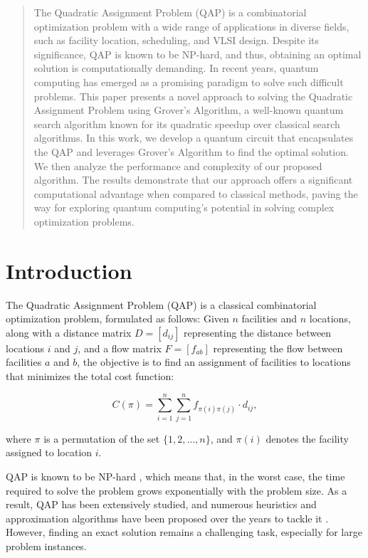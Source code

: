 \begin{abstract}

The Quadratic Assignment Problem (QAP) is a combinatorial optimization problem with a wide range of applications in diverse fields, such as facility location, scheduling, and VLSI design. Despite its significance, QAP is known to be NP-hard, and thus, obtaining an optimal solution is computationally demanding. In recent years, quantum computing has emerged as a promising paradigm to solve such difficult problems. This paper presents a novel approach to solving the Quadratic Assignment Problem using Grover's Algorithm, a well-known quantum search algorithm known for its quadratic speedup over classical search algorithms. In this work, we develop a quantum circuit that encapsulates the QAP and leverages Grover's Algorithm to find the optimal solution. We then analyze the performance and complexity of our proposed algorithm. The results demonstrate that our approach offers a significant computational advantage when compared to classical methods, paving the way for exploring quantum computing's potential in solving complex optimization problems.

\end{abstract}

\section{Introduction}

The Quadratic Assignment Problem (QAP) is a classical combinatorial optimization problem, formulated as follows: Given $n$ facilities and $n$ locations, along with a distance matrix $D = [d_{ij}]$ representing the distance between locations $i$ and $j$, and a flow matrix $F = [f_{ab}]$ representing the flow between facilities $a$ and $b$, the objective is to find an assignment of facilities to locations that minimizes the total cost function:

\begin{equation}
    C(\pi) = \sum_{i=1}^{n} \sum_{j=1}^{n} f_{\pi(i)\pi(j)} \cdot d_{ij},
\end{equation}

\noindent where $\pi$ is a permutation of the set $\{1, 2, \ldots, n\}$, and $\pi(i)$ denotes the facility assigned to location $i$.

QAP is known to be NP-hard \cite{garey1979computers}, which means that, in the worst case, the time required to solve the problem grows exponentially with the problem size. As a result, QAP has been extensively studied, and numerous heuristics and approximation algorithms have been proposed over the years to tackle it \cite{kochenberger2007heuristic}. However, finding an exact solution remains a challenging task, especially for large problem instances.

